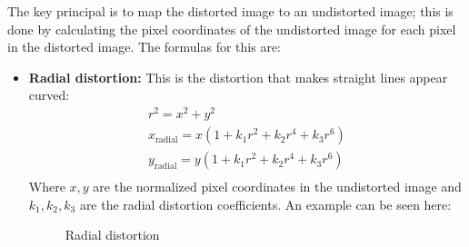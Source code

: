 The key principal is to map the distorted image to an undistorted image; this is done by calculating the pixel coordinates of the undistorted image for each pixel in the distorted image.
The formulas for this are:\autocite{opencv-undistort}
\begin{itemize}
    \item \textbf{Radial distortion:} This is the distortion that makes straight lines appear curved:
    \begin{gather*}
        r^2 = x^2 + y^2\\
        x_{\text{radial}} = x(1 + k_1 r^2 + k_2 r^4 + k_3 r^6)\\
        y_{\text{radial}} = y(1 + k_1 r^2 + k_2 r^4 + k_3 r^6)\\
    \end{gather*}
    Where \(x,y\) are the normalized pixel coordinates in the undistorted image and \( k_1, k_2, k_3 \) are the radial distortion coefficients.
    An example can be seen here:
    \begin{figure}[H]
        \centering
        \caption{Radial distortion}
        \label{fig:radial_distortion}
    \end{figure}



\end{itemize}
